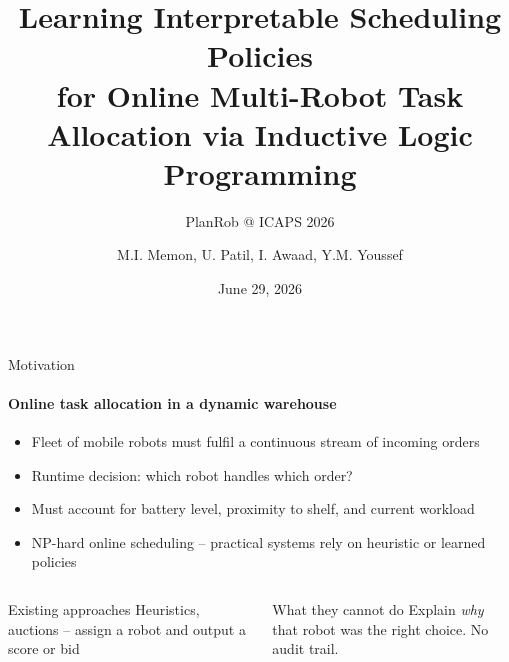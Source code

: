 \documentclass[aspectratio=169]{beamer}
\author[Memon et al.]{
  M.I. Memon, U. Patil, I. Awaad, Y.M. Youssef}
\title[Learning Interpretable Scheduling Policies for Online MRTA]
{Learning Interpretable Scheduling Policies\\for Online Multi-Robot Task Allocation via Inductive Logic Programming}
\subtitle{PlanRob @ ICAPS 2026}
\institute[H-BRS]{Hochschule Bonn-Rhein-Sieg}
\date{June 29, 2026}
\begin{document}
{
\begin{frame}
\titlepage
\end{frame}
}

\begin{frame}{Motivation}
  \framesubtitle{Online task allocation in a dynamic warehouse}
  \begin{itemize}
    \item Fleet of mobile robots must fulfil a continuous stream of incoming orders
    \item Runtime decision: \alert{which robot handles which order?}
    \item Must account for battery level, proximity to shelf, and current workload
    \item NP-hard online scheduling -- practical systems rely on heuristic or learned policies
  \end{itemize}
  \vspace{0.4em}
  \begin{columns}
      \begin{exampleblock}{Existing approaches}
        Heuristics, auctions -- assign a robot and output a score or bid
      \end{exampleblock}
      \begin{alertblock}{What they cannot do}
        Explain \emph{why} that robot was the right choice. No audit trail.
      \end{alertblock}
  \end{columns}
\end{frame}
\end{document}
